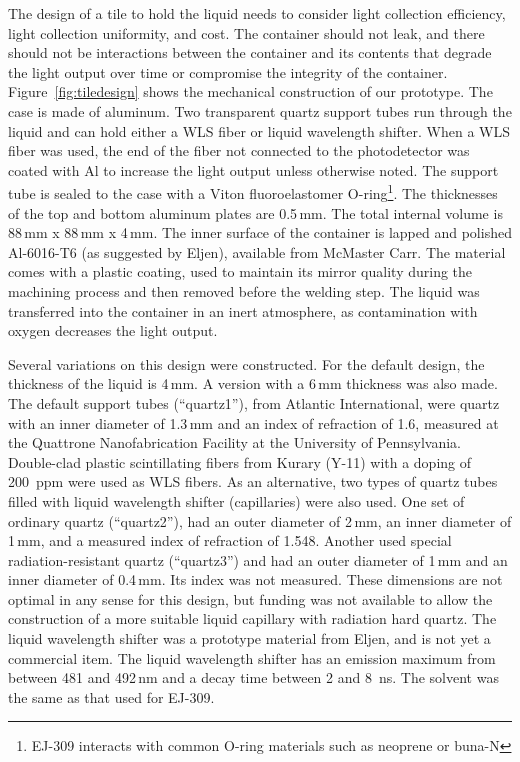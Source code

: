 \documentclass[review]{elsarticle}
\begin{document}
The design of a tile to hold the liquid needs to consider light
collection efficiency, light collection uniformity, and cost. The
container should not leak, and there should not be interactions
between the container and its contents that degrade the light output
over time or compromise the integrity of the
container. 
Figure~\ref{fig:tiledesign} shows the mechanical
construction of our prototype. The case is made of aluminum. Two
transparent quartz support tubes
run through the
liquid and can hold either a WLS fiber or liquid
wavelength shifter.
When a WLS fiber was
used, the end of the fiber not connected to the photodetector was
coated with Al to increase the light output unless otherwise
noted. The support tube is sealed to the case with a Viton
fluoroelastomer O-ring\footnote{EJ-309 interacts with common O-ring materials
such as neoprene or buna-N}. 
The thicknesses of the top and bottom aluminum
plates are 0.5\,mm. The total internal volume is 88\,mm x 88\,mm x
4\,mm. The inner surface of the container is lapped and polished
Al-6016-T6 (as suggested by Eljen),  available from McMaster Carr. The material comes with a
plastic coating, used to maintain its mirror quality during
the machining process and then removed before the welding step. The
liquid was transferred into the container in an inert atmosphere, as
contamination with oxygen decreases the light output.

Several variations on this design were constructed. For the default
design, the thickness of the liquid is 4\,mm. A version with a 6\,mm
thickness was also made. The default
support tubes (``quartz1''), from Atlantic International, were quartz with an inner
diameter of 1.3\,mm and
an index of refraction of 1.6,
 measured at the Quattrone
Nanofabrication Facility at the University of Pennsylvania.
Double-clad plastic scintillating fibers from Kurary (Y-11)  with  a doping of
200~ppm were used as WLS fibers.
As an alternative, two types of
quartz tubes filled with liquid wavelength
shifter (capillaries) were also used.  
One set  of ordinary quartz (``quartz2''),
 had an outer diameter of 2\,mm,
an inner diameter of 1\,mm, and a measured index of refraction of 1.548.
Another used special radiation-resistant quartz (``quartz3'')
and had an outer diameter of 1\,mm and an
inner diameter of 0.4\,mm.  Its index was not measured.
These dimensions are not optimal in any sense for this design, but
funding was not available to allow the construction of a more
suitable liquid capillary with radiation hard quartz.
The liquid wavelength shifter was a prototype
material from Eljen, and is not yet a commercial item. The liquid
wavelength shifter has an emission maximum from between 481 and 492\,nm
and a decay time between 2 and 8~ns. The solvent was the same as that
used for EJ-309. 
\end{document}
